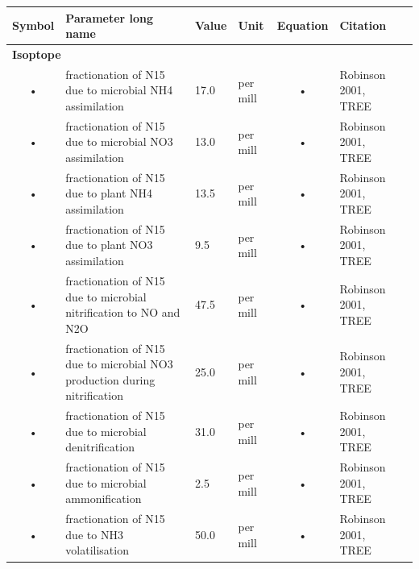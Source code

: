 \documentclass[11pt,oneside,openright,a4paper,fleqn]{book}  %
\begin{document}
\begin{table}
\begin{tabularx}{\linewidth}{|c|X|l|l|c|l|c|} %
\hline 
Symbol & Parameter long name & Value & Unit & Equation & Citation \\
\hline 

\multicolumn{6}{l}{\bf Isoptope}\\
\hline
• & fractionation of N15 due to microbial NH4 assimilation & 17.0 & per mill & • & Robinson 2001, TREE \\
• & fractionation of N15 due to microbial NO3 assimilation & 13.0 & per mill & • & Robinson 2001, TREE \\
• & fractionation of N15 due to plant NH4 assimilation & 13.5 & per mill & • & Robinson 2001, TREE \\
• & fractionation of N15 due to plant NO3 assimilation & 9.5 & per mill & • & Robinson 2001, TREE \\
• & fractionation of N15 due to microbial nitrification to NO and N2O & 47.5 & per mill & • & Robinson 2001, TREE \\
• & fractionation of N15 due to microbial NO3 production during nitrification & 25.0 & per mill & • & Robinson 2001, TREE \\
• & fractionation of N15 due to microbial denitrification & 31.0 & per mill & • & Robinson 2001, TREE \\
• & fractionation of N15 due to microbial ammonification & 2.5 & per mill & • & Robinson 2001, TREE \\
• & fractionation of N15 due to NH3 volatilisation & 50.0 & per mill & • & Robinson 2001, TREE \\

\hline 
\end{tabularx}
\end{table}
\end{document}
